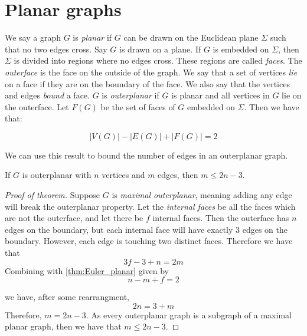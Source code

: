 \section{Planar graphs}\label{sec:Planar graphs}
We say a graph \(G\) is \textit{planar} if \(G\) can be drawn on the Euclidean plane \(\Sigma \) such that no two edges cross. Say \(G\) is drawn on a plane. If \(G\) is embedded on \(\Sigma \), then \(\Sigma \) is divided into regions where no edges cross. These regions are called \textit{faces}. The \textit{outerface} is the face on the outside of the graph. We say that a set of vertices \textit{lie} on a face if they are on the boundary of the face. We also say that the vertices and edges \textit{bound} a face. \(G\) is \textit{outerplanar} if \(G\) is planar and all vertices in \(G\) lie on the outerface. 
Let \(F(G)\) be the set of faces of \(G\) embedded on \(\Sigma\). Then we have that:
\begin{theorem}\label{thm:Euler_planar}
	\begin{equation}
		|V(G)| - |E(G)| + |F(G)| = 2
	\end{equation}
\end{theorem}

We can use this result to bound the number of edges in an outerplanar graph.
\begin{theorem}\label{thm:outerplanar_bound}
	If \(G\) is outerplanar with \(n\) vertices and \(m\) edges, then \(m \leq 2n - 3\).
\end{theorem}

\begin{proof}[Proof of theorem]
	Suppose \(G\) is \textit{maximal outerplanar}, meaning adding any edge will break the outerplanar property. Let the \textit{internal faces} be all the faces which are not the outerface, and let there be \(f\) internal faces. Then the outerface has \(n\) edges on the boundary, but each internal face will have exactly \(3\) edges on the boundary. However, each edge is touching two distinct faces. Therefore we have that
	\begin{equation}
		3 f - 3 + n = 2m
	\end{equation}
	Combining with \cref{thm:Euler_planar} given by
	\begin{equation}
		n - m + f = 2
	\end{equation}
	
	we have, after some rearrangment, 
	\begin{equation}
		2n = 3 + m
	\end{equation}
	Therefore, \(m = 2n - 3\). As every outerplanar graph is a subgraph of a maximal planar graph, then we have that \(m \leq 2n - 3\). 
\end{proof}
